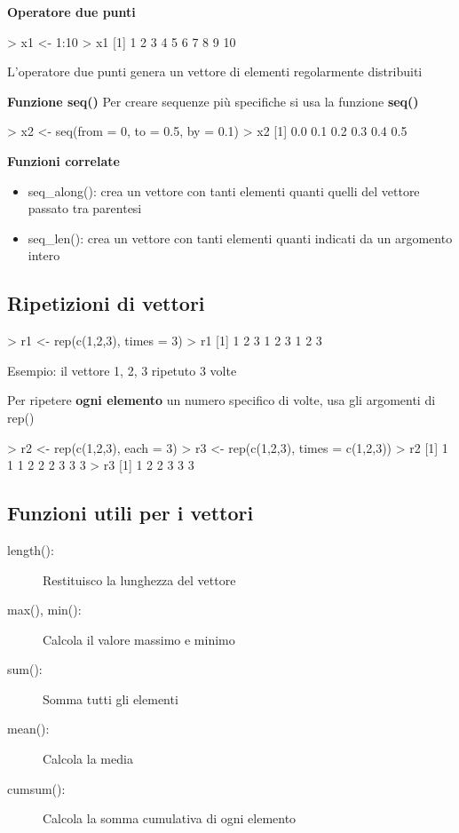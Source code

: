 \textbf{Operatore due punti}
\begin{codiceR}
  > x1 <- 1:10
> x1
  [1] 1 2 3 4 5 6 7 8 9 10
\end{codiceR}
L'operatore due punti genera un vettore di elementi regolarmente distribuiti

\textbf{Funzione seq()}
Per creare sequenze più specifiche si usa la funzione \textbf{seq()}

\begin{codiceR}
  > x2 <- seq(from = 0, to = 0.5, by = 0.1)
> x2
  [1] 0.0 0.1 0.2 0.3 0.4 0.5
\end{codiceR}

\textbf{Funzioni correlate}
\begin{itemize}
  \item seq\_along(): crea un vettore con tanti elementi quanti quelli del vettore passato tra parentesi
  \item seq\_len(): crea un vettore con tanti elementi quanti indicati da un argomento intero
\end{itemize}


\subsection{Ripetizioni di vettori}
\begin{codiceR}
  > r1 <- rep(c(1,2,3), times = 3)
> r1
  [1] 1 2 3 1 2 3 1 2 3
\end{codiceR}
Esempio: il vettore 1, 2, 3 ripetuto 3 volte

Per ripetere \textbf{ogni elemento} un numero specifico di volte, usa gli argomenti di rep()

\begin{codiceR}
  > r2 <- rep(c(1,2,3), each = 3)
> r3 <- rep(c(1,2,3), times = c(1,2,3))
> r2
  [1] 1 1 1 2 2 2 3 3 3
> r3
  [1] 1 2 2 3 3 3

\end{codiceR}

\subsection{Funzioni utili per i vettori}
\begin{description}
  \item[length():] Restituisco la lunghezza del vettore
  \item[max(), min():] Calcola il valore massimo e minimo
  \item[sum():] Somma tutti gli elementi
  \item[mean():] Calcola la media
  \item[cumsum():] Calcola la somma cumulativa di ogni elemento 
\end{description}

